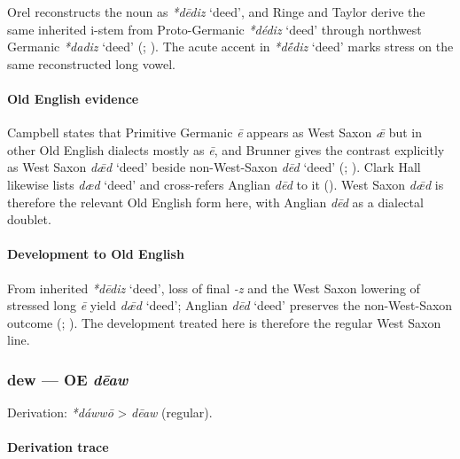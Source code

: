\documentclass[
  british,
  a4paper,
]{article}
\providecommand{\Recon}[1]{\emph{*#1}}
\begin{document}
Orel reconstructs the noun as \Recon{dēdiz} `deed', and Ringe and Taylor
derive the same inherited i-stem from Proto-Germanic \Recon{dédiz}
`deed' through northwest Germanic \Recon{dadiz} `deed'
(;
). The acute accent
in \Recon{dḗdiz} `deed' marks stress on the same reconstructed long
vowel.

\paragraph{Old English evidence}\label{old-english-evidence-15}

Campbell states that Primitive Germanic \emph{ē} appears as West Saxon
\emph{ǣ} but in other Old English dialects mostly as \emph{ē}, and
Brunner gives the contrast explicitly as West Saxon \emph{dǣd} `deed'
beside non-West-Saxon \emph{dēd} `deed'
(;
). Clark Hall likewise
lists \emph{dæd} `deed' and cross-refers Anglian \emph{dēd} to it
(). West Saxon \emph{dǣd}
is therefore the relevant Old English form here, with Anglian \emph{dēd}
as a dialectal doublet.

\paragraph{Development to Old
English}\label{development-to-old-english-15}

From inherited \Recon{dēdiz} `deed', loss of final \emph{-z} and the
West Saxon lowering of stressed long \emph{ē} yield \emph{dǣd} `deed';
Anglian \emph{dēd} `deed' preserves the non-West-Saxon outcome
(;
). The development
treated here is therefore the regular West Saxon line.

\subsubsection{\texorpdfstring{dew --- OE
\emph{dēaw}}{dew --- OE dēaw}}\label{dew-oe-dux113aw}

Derivation: \emph{*dáwwō} \textgreater{} \emph{dēaw} (regular).

\paragraph{Derivation trace}\label{derivation-trace-18}
\end{document}
